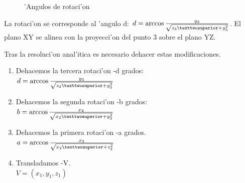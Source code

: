 \begin{figure}[h!]
	\begin{center}
     	\end{center}
    	\caption{'Angulos de rotaci'on}\label{fig:triang5}
\end{figure}

La rotaci'on se corresponde al 'angulo d: $d = \arccos {y_3 \over {\sqrt{z_3²+y_3^2}}}$. El plano XY se alinea con la proyecci'on del punto 3 sobre el plano YZ. 

Tras la resoluci'on anal'itica es necesario dehacer estas modificaciones. 

\begin{enumerate}
\item Dehacemos la tercera rotaci'on -d grados: \bigskip \\
$d = \arccos {y_3 \over {\sqrt{z_3²+y_3^2}}}$
\item Dehacemos la segunda rotaci'on -b grados: \bigskip \\ $b = \arccos {x_2 \over {\sqrt{x_2²+y_2^2}}}$
\item Dehacemos la primera rotaci'on -a grados.\bigskip \\ $a = \arccos {x_2 \over {\sqrt{x_2²+z_2^2}}}$
\item Transladamos -V. \bigskip \\ $V = (x_1,y_1,z_1)$
\end{enumerate}

